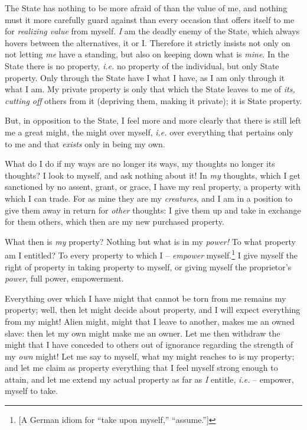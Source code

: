 The State has nothing to be more afraid of than the value of me, and nothing 
must it more carefully guard against than every occasion that offers itself to 
me for \textit{realizing value} from myself. \textit{I} am the deadly enemy of 
the State, which always hovers between the alternatives, it or I. Therefore it 
strictly insists not only on not letting \textit{me} have a standing, but also 
on keeping down what is \textit{mine}. In the State there is no property, 
\textit{i.e.} no property of the individual, but only State property. Only 
through the State have I what I have, as I am only through it what I am. My 
private property is only that which the State leaves to me of \textit{its, 
cutting off} others from it (depriving them, making it private); it is State 
property.

But, in opposition to the State, I feel more and more clearly that there is 
still left me a great might, the might over myself, \textit{i.e.} over 
everything that pertains only to me and that \textit{exists} only in being my 
own.

What do I do if my ways are no longer its ways, my thoughts no longer its 
thoughts? I look to myself, and ask nothing about it! In \textit{my} thoughts, 
which I get sanctioned by no assent, grant, or grace, I have my real property, 
a property with which I can trade. For as mine they are my \textit{creatures}, 
and I am in a position to give them away in return for \textit{other} 
thoughts: I give them up and take in exchange for them others, which then are 
my new purchased property.

What then is \textit{my} property? Nothing but what is in my \textit{power!} 
To what property am I entitled? To every property to which I -- 
\textit{empower} myself.\footnote{[A German idiom for ``take upon myself,'' 
``assume.'']} I give myself the right of property in taking property to 
myself, or giving myself the proprietor's \textit{power}, full power, 
empowerment.

Everything over which I have might that cannot be torn from me remains my 
property; well, then let might decide about property, and I will expect 
everything from my might! Alien might, might that I leave to another, makes me 
an owned slave: then let my own might make me an owner. Let me then withdraw 
the might that I have conceded to others out of ignorance regarding the 
strength of my \textit{own} might! Let me say to myself, what my might reaches 
to is my property; and let me claim as property everything that I feel myself 
strong enough to attain, and let me extend my actual property as far as 
\textit{I} entitle, \textit{i.e.} -- empower, myself to take.

